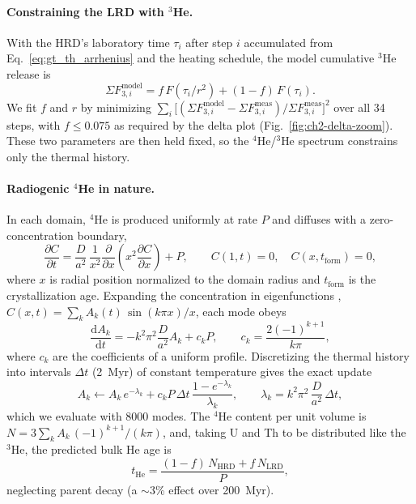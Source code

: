 \paragraph{Constraining the LRD with $^3$He.}
With the HRD's laboratory time $\tau_i$ after step $i$ accumulated from
Eq.~\ref{eq:gt_th_arrhenius} and the heating schedule, the model cumulative
$^3$He release is
\begin{equation}
  \Sigma F^{\mathrm{model}}_{3,i} = f\,F\!\left(\tau_i/r^2\right) + (1-f)\,F(\tau_i).
  \label{eq:gt_th_twodomain}
\end{equation}
We fit $f$ and $r$ by minimizing
$\sum_i \big[(\Sigma F^{\mathrm{model}}_{3,i}-\Sigma F^{\mathrm{meas}}_{3,i})/\Sigma F^{\mathrm{meas}}_{3,i}\big]^2$
over all 34 steps, with $f \le 0.075$ as required by the delta plot
(Fig.~\ref{fig:ch2-delta-zoom}). These two parameters are then held fixed, so
the $^4$He/$^3$He spectrum constrains only the thermal history.

\paragraph{Radiogenic $^4$He in nature.}
In each domain, $^4$He is produced uniformly at rate $P$ and diffuses with a
zero-concentration boundary,
\begin{equation}
  \frac{\partial C}{\partial t} = \frac{D}{a^2}\,\frac{1}{x^2}\frac{\partial}{\partial x}\!\left(x^2\frac{\partial C}{\partial x}\right) + P,
  \qquad C(1,t)=0,\quad C(x,t_\mathrm{form})=0,
  \label{eq:gt_th_pde}
\end{equation}
where $x$ is radial position normalized to the domain radius and
$t_\mathrm{form}$ is the crystallization age. Expanding the concentration in
eigenfunctions \citep{carslawjaeger1959},
$C(x,t)=\sum_k A_k(t)\,\sin(k\pi x)/x$, each mode obeys
\begin{equation}
  \frac{\mathrm{d}A_k}{\mathrm{d}t} = -k^2\pi^2\frac{D}{a^2}A_k + c_k P,
  \qquad c_k = \frac{2(-1)^{k+1}}{k\pi},
  \label{eq:gt_th_modes}
\end{equation}
where $c_k$ are the coefficients of a uniform profile. Discretizing the
thermal history into intervals $\Delta t$ (2~Myr) of constant temperature gives
the exact update
\begin{equation}
  A_k \leftarrow A_k\,e^{-\lambda_k} + c_k P\,\Delta t\,\frac{1-e^{-\lambda_k}}{\lambda_k},
  \qquad \lambda_k = k^2\pi^2\,\frac{D}{a^2}\,\Delta t ,
  \label{eq:gt_th_update}
\end{equation}
which we evaluate with 8000 modes. The $^4$He content per unit volume is
$N = 3\sum_k A_k\,(-1)^{k+1}/(k\pi)$, and, taking U and Th to be distributed
like the $^3$He, the predicted bulk He age is
\begin{equation}
  t_\mathrm{He} = \frac{(1-f)\,N_\mathrm{HRD} + f\,N_\mathrm{LRD}}{P},
  \label{eq:gt_th_age}
\end{equation}
neglecting parent decay (a $\sim$3\% effect over 200~Myr).

